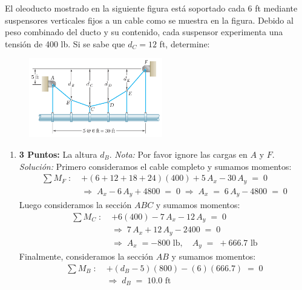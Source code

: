 \documentclass[ a4paper, twoside, 11pt]{article}
\begin{document}
\begin{problem}
El oleoducto mostrado en la siguiente figura est\'a soportado cada 6 ft mediante suspensores verticales fijos a un cable como se muestra en la figura. Debido al peso combinado del ducto y su contenido, cada suspensor experimenta una tensi\'on de 400 lb. Si se sabe que $d_C = 12$ ft, determine: 

\begin{figure}[htb]
\centering
\includegraphics[width=0.52\textwidth]{prob-cables.jpg}
\end{figure}

\begin{enumerate}[label=\textbf{\alph*)}]
\item \textbf{3 Puntos:} La altura $d_B$. \emph{Nota:} Por favor ignore las cargas en $A$ y $F$. \\[1ex] \emph{Soluci\'on:} Primero consideramos el cable completo y sumamos momentos: 
\begin{align*}
\sum M_F \; \colon \;
& +(6+12+18+24)(400) + 5 \, A_x - 30 \, A_y \; = \; 0 \\[1ex]
& \Longrightarrow \;
A_x - 6 \, A_y + 4800 \; = \; 0
\; \Longrightarrow \;
A_x \; = \; 6 \, A_y - 4800 \; = \; 0
\end{align*}
Luego consideramos la secci\'on $ABC$ y sumamos momentos: 
\begin{align*}
\sum M_C \; \colon \;
& +6(400) -7 \, A_x - 12 \, A_y \; = \; 0 \\[1ex]
& \Longrightarrow \; 7 \, A_x + 12 \, A_y - 2400 \; = \; 0 \\[1ex]
& \Longrightarrow \;
A_x \; = -800 \text{ lb}, \quad A_y \; = \; +666.7 \text{ lb}
\end{align*}
Finalmente, consideramos la secci\'on $AB$ y sumamos momentos: 
\begin{align*}
\sum M_B \; \colon \;
& +( d_B - 5 )(800) - (6)(666.7) \; = \; 0 \\[1ex]
& \Longrightarrow \;
d_B \; = \; 10.0 \text{ ft}
\end{align*}


\end{enumerate}
\end{problem}
\end{document}

